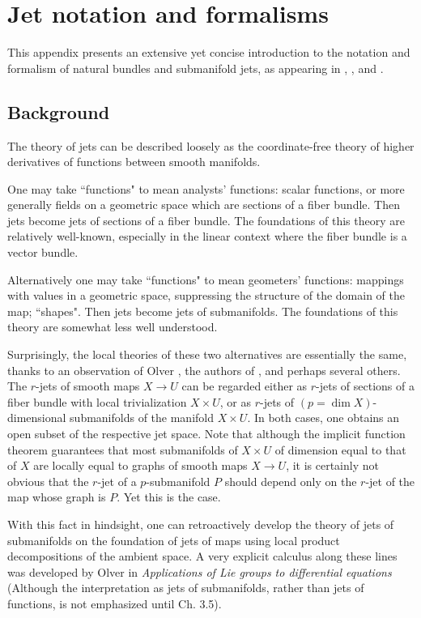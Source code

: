\documentclass[12pt]{article}
\numberwithin{equation}{section}
\theoremstyle{plain}
\theoremstyle{definition}
\begin{document}
\appendix

\section{Jet notation and formalisms}\label{jetsapp}

This appendix presents an extensive yet concise introduction to the notation and formalism of natural bundles and submanifold jets, as appearing in \cite{olver}, \cite{eds}, and \cite{kms}.

\subsection{Background}

The theory of jets can be described loosely as the coordinate-free theory of higher derivatives of functions between smooth manifolds.

One may take ``functions" to mean analysts' functions: scalar functions, or more generally fields on a geometric space which are sections of a fiber bundle. Then jets become jets of sections of a fiber bundle. The foundations of this theory are relatively well-known, especially in the linear context where the fiber bundle is a vector bundle.

Alternatively one may take ``functions" to mean geometers' functions: mappings with values in a geometric space, suppressing the structure of the domain of the map; ``shapes". Then jets become jets of submanifolds. The foundations of this theory are somewhat less well understood.

Surprisingly, the local theories of these two alternatives are essentially the same, thanks to an observation of Olver \cite{olver}, the authors of \cite{eds}, and perhaps several others. The $r$-jets of smooth maps $X\rightarrow U$ can be regarded either as $r$-jets of sections of a fiber bundle with local trivialization $X\times U$, or as $r$-jets of $(p=\dim X)$-dimensional submanifolds of the manifold $X\times U$. In both cases, one obtains an open subset of the respective jet space. Note that although the implicit function theorem guarantees that most submanifolds of $X\times U$ of dimension equal to that of $X$ are locally equal to graphs of smooth maps $X\rightarrow U$, it is certainly not obvious that the $r$-jet of a $p$-submanifold $P$ should depend only on the $r$-jet of the map whose graph is $P$. Yet this is the case.

With this fact in hindsight, one can retroactively develop the theory of jets of submanifolds on the foundation of jets of maps using local product decompositions of the ambient space. A very explicit calculus along these lines was developed by Olver in \emph{Applications of Lie groups to differential equations} \cite{olver} (Although the interpretation as jets of submanifolds, rather than jets of functions, is not emphasized until \cite{olver} Ch. 3.5). 
\end{document}

